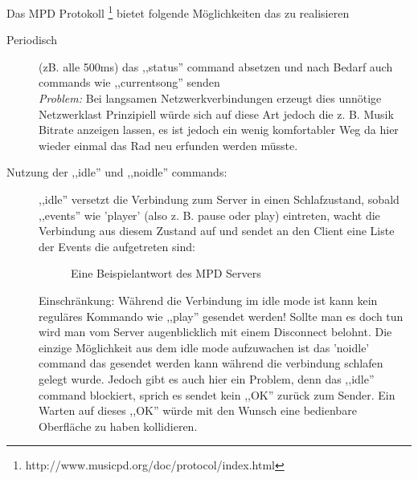 Das MPD Protokoll \footnote{http://www.musicpd.org/doc/protocol/index.html} bietet folgende Möglichkeiten das zu realisieren
\begin{description}
    \item [Periodisch] (zB. alle 500ms) das ,,status'' command absetzen und nach Bedarf auch commands wie ,,currentsong''
        senden
        \\
        \emph{Problem:} Bei langsamen Netzwerkverbindungen erzeugt dies unnötige Netzwerklast 
        Prinzipiell würde sich auf diese Art jedoch die z. B. Musik Bitrate anzeigen lassen, es ist jedoch ein
        wenig komfortabler Weg da hier wieder einmal das Rad neu erfunden werden müsste.
    \item [Nutzung der ,,idle'' und ,,noidle'' commands:]
        ,,idle'' versetzt die Verbindung zum Server in einen Schlafzustand, sobald ,,events'' wie 'player' (also z. B. pause oder play) 
        eintreten, wacht die Verbindung aus diesem Zustand auf und sendet an den Client eine Liste der Events die aufgetreten sind:

\begin{figure}[h!]
    
\caption{Eine Beispielantwort des MPD Servers}
\label{dd_state}
\end{figure}

        Einschränkung: Während die Verbindung im idle mode ist kann kein reguläres Kommando wie ,,play'' gesendet werden!
        Sollte man es doch tun wird man vom Server augenblicklich mit einem Disconnect belohnt.
        Die einzige Möglichkeit aus dem idle mode aufzuwachen ist das 'noidle' command das gesendet werden
        kann während die verbindung schlafen gelegt wurde.
        Jedoch gibt es auch hier ein Problem, denn das ,,idle'' command blockiert, sprich es sendet kein ,,OK'' zurück zum Sender.
        Ein Warten auf dieses ,,OK'' würde mit den Wunsch eine bedienbare Oberfläche zu haben kollidieren.
\end{description}

